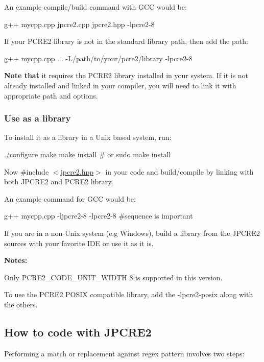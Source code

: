 An example compile/build command with G\+CC would be\+:


\begin{DoxyCode}
g++ mycpp.cpp jpcre2.cpp jpcre2.hpp -lpcre2-8
\end{DoxyCode}


If your P\+C\+R\+E2 library is not in the standard library path, then add the path\+:


\begin{DoxyCode}
g++ mycpp.cpp ... -L/path/to/your/pcre2/library -lpcre2-8
\end{DoxyCode}


{\bfseries Note that} it requires the P\+C\+R\+E2 library installed in your system. If it is not already installed and linked in your compiler, you will need to link it with appropriate path and options.\hypertarget{index_install-as-a-library}{}\subsubsection{Use as a library}\label{index_install-as-a-library}
To install it as a library in a Unix based system, run\+:


\begin{DoxyCode}
./configure
make
make install # or sudo make install
\end{DoxyCode}
 Now {\ttfamily \#include $<$\hyperlink{jpcre2_8hpp}{jpcre2.\+hpp}$>$} in your code and build/compile by linking with both J\+P\+C\+R\+E2 and P\+C\+R\+E2 library.

An example command for G\+CC would be\+:


\begin{DoxyCode}
g++  mycpp.cpp -ljpcre2-8 -lpcre2-8 #sequence is important
\end{DoxyCode}


If you are in a non-\/\+Unix system (e.\+g Windows), build a library from the J\+P\+C\+R\+E2 sources with your favorite I\+DE or use it as it is.

{\bfseries Notes\+:}


\begin{DoxyEnumerate}
\item Only {\ttfamily P\+C\+R\+E2\+\_\+\+C\+O\+D\+E\+\_\+\+U\+N\+I\+T\+\_\+\+W\+I\+D\+TH} 8 is supported in this version.
\item To use the {\ttfamily P\+C\+R\+E2 P\+O\+S\+IX} compatible library, add the {\ttfamily -\/lpcre2-\/posix} along with the others.
\end{DoxyEnumerate}\hypertarget{index_how-to-code-with-jpcre2}{}\subsection{How to code with J\+P\+C\+R\+E2}\label{index_how-to-code-with-jpcre2}
Performing a match or replacement against regex pattern involves two steps\+:


